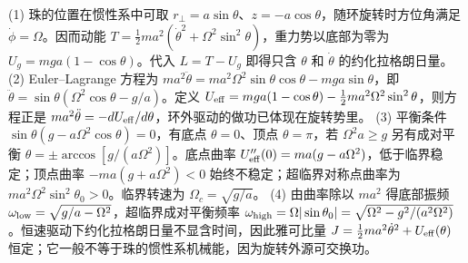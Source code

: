 (1) 珠的位置在惯性系中可取 \(r_\perp=a\sin\theta\)、\(z=-a\cos\theta\)，随环旋转时方位角满足 \(\dot\phi=\Omega\)。因而动能 \(T=\tfrac12ma^2(\dot\theta^2+\Omega^2\sin^2\theta)\)，重力势以底部为零为 \(U_g=mga(1-\cos\theta)\)。代入 \(L=T-U_g\) 即得只含 \(\theta\) 和 \(\dot\theta\) 的约化拉格朗日量。
(2) Euler–Lagrange 方程为 \(ma^2\ddot\theta=ma^2\Omega^2\sin\theta\cos\theta-mga\sin\theta\)，即 \(\ddot\theta=\sin\theta(\Omega^2\cos\theta-g/a)\)。定义 \(U_{\rm eff}=mga(1-\cos\theta)-\tfrac12ma^2\Omega^2\sin^2\theta\)，则方程正是 \(ma^2\ddot\theta=-dU_{\rm eff}/d\theta\)，环外驱动的做功已体现在旋转势里。
(3) 平衡条件 \(\sin\theta(g-a\Omega^2\cos\theta)=0\)，有底点 \(\theta=0\)、顶点 \(\theta=\pi\)，若 \(\Omega^2a\ge g\) 另有成对平衡 \(\theta=\pm\arccos[g/(a\Omega^2)]\)。底点曲率 \(U_{\rm eff}''(0)=ma(g-a\Omega^2)\)，低于临界稳定；顶点曲率 \(-ma(g+a\Omega^2)<0\) 始终不稳定；超临界对称点曲率为 \(ma^2\Omega^2\sin^2\theta_0>0\)。临界转速为 \(\Omega_c=\sqrt{g/a}\)。
(4) 由曲率除以 \(ma^2\) 得底部振频 \(\omega_{\rm low}=\sqrt{g/a-\Omega^2}\)，超临界成对平衡频率 \(\omega_{\rm high}=\Omega|\sin\theta_0|=\sqrt{\Omega^2-g^2/(a^2\Omega^2)}\)。恒速驱动下约化拉格朗日量不显含时间，因此雅可比量 \(J=\tfrac12ma^2\dot\theta^2+U_{\rm eff}(\theta)\) 恒定；它一般不等于珠的惯性系机械能，因为旋转外源可交换功。
